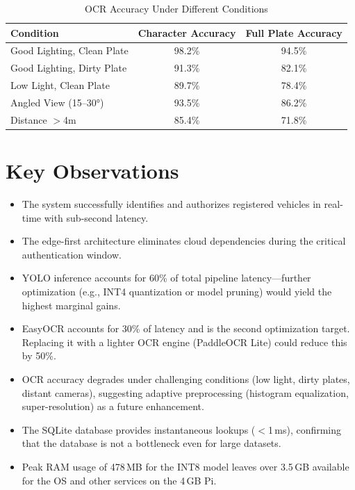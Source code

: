 \begin{table}[H]
\centering
\caption{OCR Accuracy Under Different Conditions}
\renewcommand{\arraystretch}{1.3}
\begin{tabular}{|l|c|c|}
\hline
\textbf{Condition} & \textbf{Character Accuracy} & \textbf{Full Plate Accuracy} \\
\hline
Good Lighting, Clean Plate & 98.2\% & 94.5\% \\
\hline
Good Lighting, Dirty Plate & 91.3\% & 82.1\% \\
\hline
Low Light, Clean Plate & 89.7\% & 78.4\% \\
\hline
Angled View (15--30°) & 93.5\% & 86.2\% \\
\hline
Distance $>$4m & 85.4\% & 71.8\% \\
\hline
\end{tabular}
\end{table}

\section{Key Observations}
\begin{itemize}
    \item The system successfully identifies and authorizes registered vehicles in real-time with sub-second latency.
    \item The edge-first architecture eliminates cloud dependencies during the critical authentication window.
    \item YOLO inference accounts for 60\% of total pipeline latency---further optimization (e.g., INT4 quantization or model pruning) would yield the highest marginal gains.
    \item EasyOCR accounts for 30\% of latency and is the second optimization target. Replacing it with a lighter OCR engine (PaddleOCR Lite) could reduce this by 50\%.
    \item OCR accuracy degrades under challenging conditions (low light, dirty plates, distant cameras), suggesting adaptive preprocessing (histogram equalization, super-resolution) as a future enhancement.
    \item The SQLite database provides instantaneous lookups ($<$1\,ms), confirming that the database is not a bottleneck even for large datasets.
    \item Peak RAM usage of 478\,MB for the INT8 model leaves over 3.5\,GB available for the OS and other services on the 4\,GB Pi.
\end{itemize}


